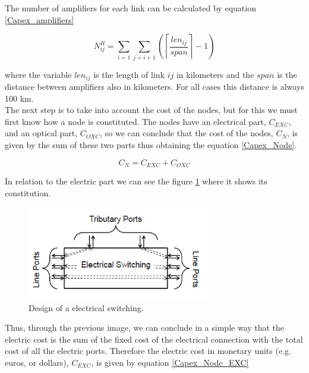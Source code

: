 \vspace{11pt}
The number of amplifiers for each link can be calculated by equation \ref{Capex_amplifiers}

\begin{equation}
N^R_{ij} = \sum_{i=1}\sum\limits_{j=i+1}\left(\left\lceil\frac{len_{ij}}{span}\right\rceil-1\right)
\label{Capex_amplifiers}
\end{equation}

\vspace{11pt}
\noindent
where the variable $len_{ij}$ is the length of link $ij$ in kilometers and the $span$ is the distance between amplifiers also in kilometers. For all cases this distance is always 100 km.\\

\vspace{13pt}
The next step is to take into account the cost of the nodes, but for this we must first know how a node is constituted. The nodes have an electrical part, $C_{EXC}$, and an optical part, $C_{OXC}$, so we can conclude that the cost of the nodes, $C_N$, is given by the sum of these two parts thus obtaining the equation \ref{Capex_Node}.

\begin{equation}
C_N = C_{EXC} + C_{OXC}
\label{Capex_Node}
\end{equation}

\newpage
In relation to the electric part we can see the figure \ref{exc_design} where it shows its constitution.\\

\begin{figure}[h!]
\centering
\includegraphics[width=8cm]{sdf/ILP/figures/exc_design}
\caption{Design of a electrical switching.}
\label{exc_design}
\end{figure}


Thus, through the previous image, we can conclude in a simple way that the electric cost is the sum of the fixed cost of the electrical connection with the total cost of all the electric ports.
Therefore the electric cost in monetary units (e.g. euros, or dollars), $C_{EXC}$, is given by equation \ref{Capex_Node_EXC}

